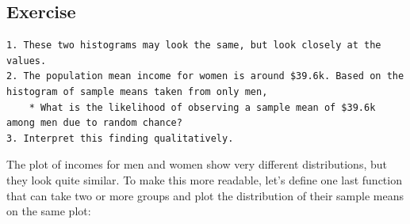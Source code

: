 \documentclass[
  letterpaper,
  DIV=11,
  numbers=noendperiod]{scrreprt}
\begin{document}
\hypertarget{exercise-16}{%
\subsection{Exercise}\label{exercise-16}}

\begin{verbatim}
1. These two histograms may look the same, but look closely at the values. 
2. The population mean income for women is around $39.6k. Based on the histogram of sample means taken from only men, 
    * What is the likelihood of observing a sample mean of $39.6k among men due to random chance?
3. Interpret this finding qualitatively.
\end{verbatim}

The plot of incomes for men and women show very different distributions,
but they look quite similar. To make this more readable, let's define
one last function that can take two or more groups and plot the
distribution of their sample means on the same plot:
\end{document}
